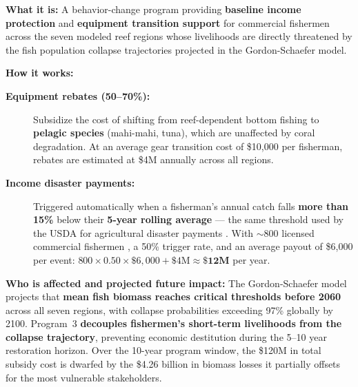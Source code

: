 \documentclass[10pt,letterpaper]{article}
\begin{document}
\begin{tcolorbox}[title=Program 3: Fishermen Income Subsidies --- \$12M Annual Total,
  colback=orange!5, colframe=orange!60!black, fonttitle=\bfseries, breakable]

  \textbf{What it is:} A behavior-change program providing \textbf{baseline income protection} and \textbf{equipment transition support} for commercial fishermen across the seven modeled reef regions whose livelihoods are directly threatened by the fish population collapse trajectories projected in the Gordon-Schaefer model.

  \medskip
  \textbf{How it works:}
  \begin{description}
    \item[\textbf{Equipment rebates (50--70\%):}] Subsidize the cost of shifting from reef-dependent bottom fishing to \textbf{pelagic species} (mahi-mahi, tuna), which are unaffected by coral degradation. At an average gear transition cost of \$10,000 per fisherman, rebates are estimated at \$4M annually across all regions.
    \item[\textbf{Income disaster payments:}] Triggered automatically when a fisherman's annual catch falls \textbf{more than 15\%} below their \textbf{5-year rolling average} --- the same threshold used by the USDA for agricultural disaster payments \cite{usda_disaster}. With $\sim$800 licensed commercial fishermen \cite{fwc_fishing_records, noaa_rvc}, a 50\% trigger rate, and an average payout of \$6,000 per event: $800 \times 0.50 \times \$6{,}000 + \$4\text{M} \approx \mathbf{\$12\text{M}}$ per year.
  \end{description}

  \medskip
  \textbf{Who is affected and projected future impact:} The Gordon-Schaefer model projects that \textbf{mean fish biomass reaches critical thresholds before 2060} across all seven regions, with collapse probabilities exceeding 97\% globally by 2100. Program~3 \textbf{decouples fishermen's short-term livelihoods from the collapse trajectory}, preventing economic destitution during the 5--10 year restoration horizon. Over the 10-year program window, the \$120M in total subsidy cost is dwarfed by the \$4.26 billion in biomass losses it partially offsets for the most vulnerable stakeholders.
\end{tcolorbox}

\medskip
\end{document}
